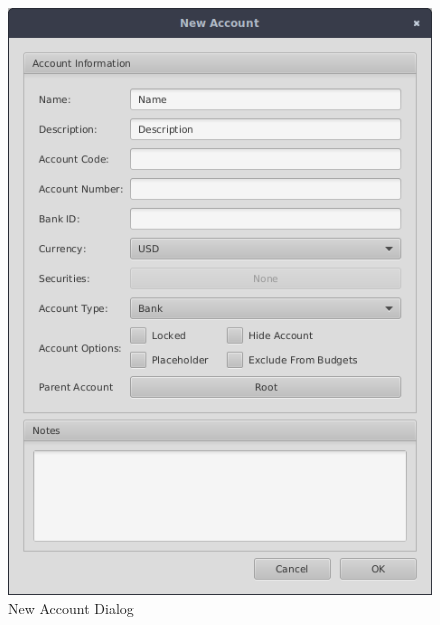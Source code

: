 \documentclass[letterpaper,12pt]{book}
\begin{document}
    \begin{figure}[H]
        \caption{New Account Dialog}
        \includegraphics[width=0.55\linewidth]{images/account-dialog}
    \end{figure}
\end{document}
